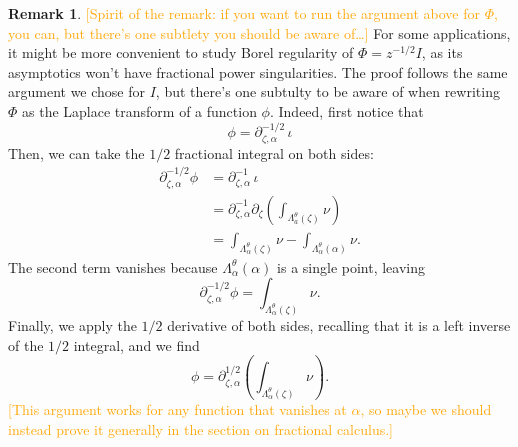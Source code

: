 \documentclass{article}
\newcommand{\fracderiv}[3]{\partial^{#1}_{#2, #3}}
\theoremstyle{definition}
\newtheorem{remark}[definition]{Remark}
\theoremstyle{plain}
\begin{document}
\begin{remark}\label{rmk:1/2-deriv}
    \textcolor{orange}{[Spirit of the remark: if you want to run the argument above for $\Phi$, you can, but there's one subtlety you should be aware of\ldots]} For some applications, it might be more convenient to study Borel regularity of $\Phi=z^{-1/2}I$, as its asymptotics won't have fractional power singularities. The proof follows the same argument we chose for $I$, but there's one subtulty to be aware of when rewriting $\Phi$ as the Laplace transform of a function $\phi$. Indeed, first notice that \[\phi = \fracderiv{-1/2}{\zeta}{\alpha} \, \iota \]
    Then, we can take the $1/2$ fractional integral on both sides:
    \begin{align*}
        \fracderiv{-1/2}{\zeta}{\alpha} \phi &= \fracderiv{-1}{\zeta}{\alpha} \, \iota \\
        & = \fracderiv{-1}{\zeta}{\alpha} \partial_\zeta \left( \int_{\Lambda_a^\theta(\zeta)}\nu \right) \\
        & = \int_{\Lambda_\alpha^\theta(\zeta)}\nu - \int_{\Lambda_\alpha^\theta(\alpha)}\nu.
    \end{align*}
    The second term vanishes because $\Lambda_\alpha^\theta(\alpha)$ is a single point, leaving
    \[ \fracderiv{-1/2}{\zeta}{\alpha} \phi = \int_{\Lambda_\alpha^\theta(\zeta)}\nu. \]
    Finally, we apply the $1/2$ derivative of both sides, recalling that it is a left inverse of the $1/2$ integral, and we find
    \begin{equation}\label{eqn:formula--1/2}\phi= \fracderiv{1/2}{\zeta}{\alpha} \left( \int_{\Lambda_\alpha^\theta(\zeta)}\nu \right).\end{equation}
    \textcolor{orange}{[This argument works for any function that vanishes at $\alpha$, so maybe we should instead prove it generally in the section on fractional calculus.]}
\end{remark}
\end{document}
